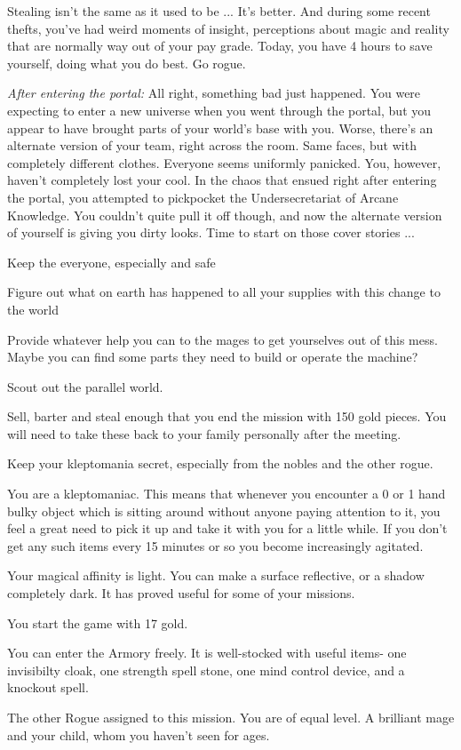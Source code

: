 \documentclass[char]{guildcamp3}
\begin{document}
Stealing isn't the same as it used to be ... It's better. And during some recent thefts, you've had weird moments of insight, perceptions about magic and reality that are normally way out of your pay grade.  Today, you have 4 hours to save yourself, doing what you do best. Go rogue.

\emph{After entering the portal:}
All right, something bad just happened. You were expecting to enter a new universe when you went through the portal, but you appear to have brought parts of your world's base with you. Worse, there's an alternate version of your team, right across the room. Same faces, but with completely different clothes. Everyone seems uniformly panicked.
You, however, haven't completely lost your cool. In the chaos that ensued right after entering the portal, you attempted to pickpocket the Undersecretariat of Arcane Knowledge. You couldn't quite pull it off though, and now the alternate version of yourself is giving you dirty looks. Time to start on those cover stories ...

\begin{itemz}[Goals]
  \item Keep the everyone, especially \cNobleOne{} and \cNobleTwo{} safe
  \item Figure out what on earth has happened to all your supplies with this change to the world
  \item Provide whatever help you can to the mages to get yourselves out of this mess. Maybe you can find some parts they need to build or operate the machine?
  \item Scout out the parallel world.
  \item Sell, barter and steal enough that you end the mission with 150 gold pieces. You will need to take these back to your family personally after the meeting. 
  \item Keep your kleptomania secret, especially from the nobles and the other rogue.  
\end{itemz}

\begin{itemz}[Notes]
	\item You are a kleptomaniac. This means that whenever you encounter a 0 or 1 hand bulky object which is sitting around without anyone paying attention to it, you feel a great need to pick it up and take it with you for a little while. If you don't get any such items every 15 minutes or so you become increasingly agitated. 
	\item Your magical affinity is light. You can make a surface reflective, or a shadow completely dark. It has proved useful for some of your missions.
	\item You start the game with 17 gold. 
	\item You can enter the Armory freely. It is well-stocked with useful items- one invisibilty cloak, one strength spell stone, one mind control device, and a knockout spell.

\end{itemz}



\begin{contacts}
	\contact{\cRogueOne{}} The other Rogue assigned to this mission. You are of equal level.
    \contact{\cMageTwo{}} A brilliant mage and your child, whom you haven't seen for ages.
\end{contacts}
\end{document}
